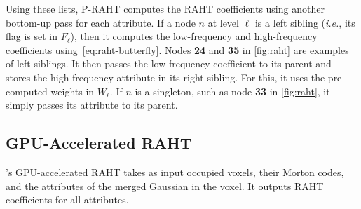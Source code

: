 %
Using these lists, P-RAHT computes the RAHT coefficients using another bottom-up pass for each attribute.
%
If a node $n$ at level $\ell$ is a left sibling (\textit{i.e.}, its flag is set in $F_\ell$), then it computes the low-frequency and high-frequency coefficients using~\cref{eq:raht-butterfly}.
%
Nodes \textbf{24} and \textbf{35} in \cref{fig:raht} are examples of left siblings.
%
It then passes the low-frequency coefficient to its parent and stores the high-frequency attribute in its right sibling.
%
For this, it uses the pre-computed weights in $W_\ell$.
%
If $n$ is a singleton, such as node \textbf{33} in \cref{fig:raht}, it simply passes its attribute to its parent.

\subsection{GPU-Accelerated RAHT}\label{sec:gpu-accelerated-raht}

  



  

%
\gsnfs{}'s GPU-accelerated RAHT takes as input occupied voxels, their Morton codes, and the attributes of the merged Gaussian in the voxel.
%
It outputs RAHT coefficients for all attributes.

